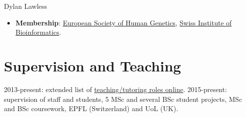 \documentclass[11pt,a4paper]{article}
\begin{document}
\begin{cv}{Dylan Lawless}
\begin{itemize}[leftmargin=*]
\item \textbf{Membership}: \href{https://www.eshg.org}{European Society of Human Genetics},
\href{https://www.sib.swiss}{Swiss Institute of Bioinformatics}.
\end{itemize}

\section*{Supervision and Teaching}
2013-present: extended list of \href{https://lawlessgenomics.com/resume/}{teaching/tutoring roles online}. 2015-present: supervision of staff and students, 5 MSc and several BSc student projects, MSc and BSc coursework, EPFL (Switzerland) and UoL (UK).


\end{cv}
\end{document}
